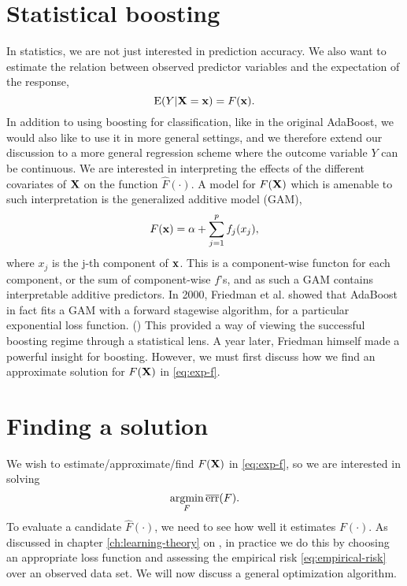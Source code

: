 \section{Statistical boosting}\label{sec:sboost}
In statistics, we are not just interested in prediction accuracy. We also want to estimate the relation between observed predictor variables and the expectation of the response,
\begin{equation}\label{eq:exp-f}
    \operatorname{E}(Y|\mathbf{X}=\mathbf{x})=F(\mathbf{x}).
\end{equation}
In addition to using boosting for classification, like in the original AdaBoost, we would also like to use it in more general settings, and we therefore extend our discussion to a more general regression scheme where the outcome variable $Y$ can be continuous. We are interested in interpreting the effects of the different covariates of $\mathbf{X}$ on the function $\hat{F}(\cdot)$. A model for $F(\mathbf{X})$ which is amenable to such interpretation is the generalized additive model (GAM),
\begin{equation}\label{eq:gam}
    F(\mathbf{x})=\alpha+\sum_{j=1}^pf_j(x_j),
\end{equation}
where $x_j$ is the j-th component of $\mathbf{x}$. This is a component-wise functon for each component, or the sum of component-wise $f$'s, and as such a GAM contains interpretable additive predictors. In 2000, Friedman et al. showed that AdaBoost in fact fits a GAM with a forward stagewise algorithm, for a particular exponential loss function. (\cite{friedman2000}) This provided a way of viewing the successful boosting regime through a statistical lens. A year later, Friedman himself made a powerful insight for boosting. However, we must first discuss how we find an approximate solution for $F(\mathbf{X})$ in \eqref{eq:exp-f}.

\section{Finding a solution}
We wish to estimate/approximate/find $F(\mathbf{X})$ in \eqref{eq:exp-f}, so we are interested in solving
\begin{equation}
    \operatorname*{argmin}_{F}\overline{\text{err}}(F).
\end{equation}
To evaluate a candidate $\hat{F}(\cdot)$, we need to see how well it estimates $F(\cdot)$. As discussed in chapter \ref{ch:learning-theory} on , in practice we do this by choosing an appropriate loss function and assessing the empirical risk \eqref{eq:empirical-risk} over an observed data set. We will now discuss a general optimization algorithm.

